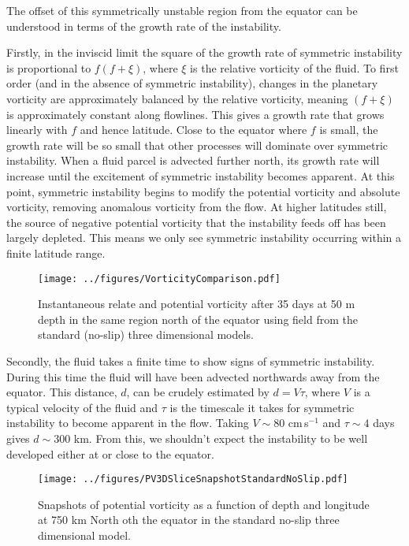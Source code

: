     The offset of this symmetrically unstable region from the equator can be understood in terms of the growth rate of the instability.
    
    Firstly, in the inviscid limit the square of the growth rate of symmetric instability is proportional to $f(f + \xi)$, where $\xi$ is the relative vorticity of the fluid. To first order (and in the absence of symmetric instability), changes in the planetary vorticity are approximately balanced by the relative vorticity, meaning $(f + \xi)$ is approximately constant along flowlines. This gives a growth rate that grows linearly with $f$ and hence latitude. Close to the equator where $f$ is small, the growth rate will be so small that other processes will dominate over symmetric instability. When a fluid parcel is advected further north, its growth rate will increase until the excitement of symmetric instability becomes apparent. At this point, symmetric instability begins to modify the potential vorticity and absolute vorticity, removing anomalous vorticity from the flow. At higher latitudes still, the source of negative potential vorticity that the instability feeds off has been largely depleted. This means we only see symmetric instability occurring within a finite latitude range.

    \begin{figure}
        \centering
        \texttt{[image: ../figures/VorticityComparison.pdf]}
        \caption{Instantaneous relate and potential vorticity after 35 days at 50 m depth in the same region north of the equator using field from the standard (no-slip) three dimensional models.}
        \label{fig:EddyRelativeAndAbsoluteVorticity}
    \end{figure}
    
    Secondly, the fluid takes a finite time to show signs of symmetric instability. During this time the fluid will have been advected northwards away from the equator. This distance, $d$, can be crudely estimated by $d = V \tau$, where $V$ is a typical velocity of the fluid and $\tau$ is the timescale it takes for symmetric instability to become apparent in the flow. Taking $V\sim 80$ cm\,s$^{-1}$ and $\tau \sim 4$ days gives $d \sim 300$ km. From this, we shouldn't expect the instability to be well developed either at or close to the equator.
    

    \begin{figure} 
        \centering
        \texttt{[image: ../figures/PV3DSliceSnapshotStandardNoSlip.pdf]}
        \caption{Snapshots of potential vorticity as a function of depth and longitude at 750 km  North oth the equator in the standard no-slip three dimensional model.}
        \label{fig:PVatFixedLatStandardNoSlip3D}
    \end{figure}

